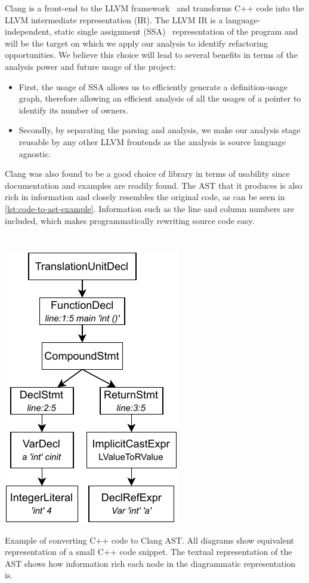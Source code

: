 \documentclass{proposal}
\begin{document}
    Clang is a front-end to the LLVM framework~\cite{Lattner2004} and transforms C++ code into the LLVM intermediate representation (IR).
    The LLVM IR is a language-independent, static single assignment (SSA)~\cite{Rosen1988} representation of the program and will be the target on which we apply our analysis to identify refactoring opportunities.
    We believe this choice will lead to several benefits in terms of the analysis power and future usage of the project:
    \begin{itemize}
        \item First, the usage of SSA allows us to efficiently generate a definition-usage graph, therefore allowing an efficient analysis of all the usages of a pointer to identify its number of owners.
        \item Secondly, by separating the parsing and analysis, we make our analysis stage reusable by any other LLVM frontends as the analysis is source language agnostic.
    \end{itemize}

    Clang was also found to be a good choice of library in terms of usability since documentation and examples are readily found.
    The AST that it produces is also rich in information and closely resembles the original code, as can be seen in \autoref{lst:code-to-ast-example}.
    Information such as the line and column numbers are included, which makes programmatically rewriting source code easy.

    \begin{listing}
        \inputminted{c++}{code/code-to-ast.cpp}
        \inputminted[fontsize=\footnotesize]{text}{code/code-to-ast.txt}
        \centerline{\includegraphics{images/code-to-ast}}
        \caption{Example of converting C++ code to Clang AST. All diagrams show equivalent representation of a small C++ code snippet. The textual representation of the AST shows how information rich each node in the diagrammatic representation is.}
        \label{lst:code-to-ast-example}
    \end{listing}
\end{document}
